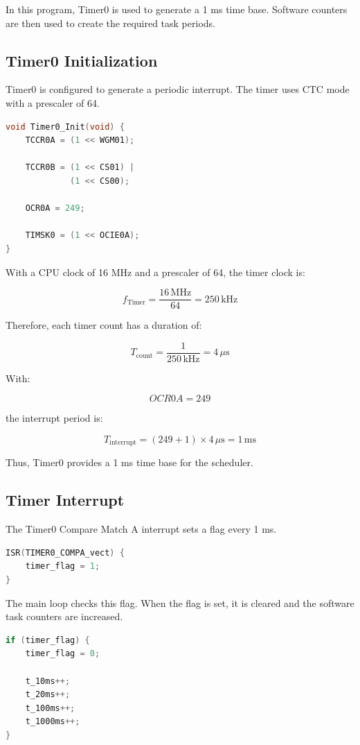 \documentclass[12pt,a4paper]{article}
\begin{document}
In this program, Timer0 is used to generate a 1 ms time base. Software
counters are then used to create the required task periods.

\subsection{Timer0 Initialization}

Timer0 is configured to generate a periodic interrupt. The timer uses
CTC mode with a prescaler of 64.

\begin{lstlisting}[language=C]
void Timer0_Init(void) {
    TCCR0A = (1 << WGM01);

    TCCR0B = (1 << CS01) |
             (1 << CS00);

    OCR0A = 249;

    TIMSK0 = (1 << OCIE0A);
}
\end{lstlisting}

With a CPU clock of 16 MHz and a prescaler of 64, the timer clock is:

\[
f_{\mathrm{Timer}}
=
\frac{16\,\mathrm{MHz}}{64}
=
250\,\mathrm{kHz}
\]

Therefore, each timer count has a duration of:

\[
T_{\mathrm{count}}
=
\frac{1}{250\,\mathrm{kHz}}
=
4\,\mu\mathrm{s}
\]

With:

\[
OCR0A=249
\]

the interrupt period is:

\[
T_{\mathrm{interrupt}}
=
(249+1)\times4\,\mu\mathrm{s}
=
1\,\mathrm{ms}
\]

Thus, Timer0 provides a 1 ms time base for the scheduler.

\subsection{Timer Interrupt}

The Timer0 Compare Match A interrupt sets a flag every 1 ms.

\begin{lstlisting}[language=C]
ISR(TIMER0_COMPA_vect) {
    timer_flag = 1;
}
\end{lstlisting}

The main loop checks this flag. When the flag is set, it is cleared
and the software task counters are increased.

\begin{lstlisting}[language=C]
if (timer_flag) {
    timer_flag = 0;

    t_10ms++;
    t_20ms++;
    t_100ms++;
    t_1000ms++;
}
\end{lstlisting}
\end{document}

